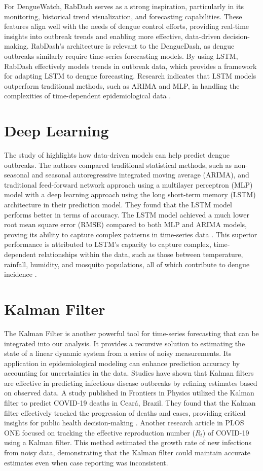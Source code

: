 For DengueWatch, RabDash serves as a strong inspiration, particularly in its monitoring, historical trend visualization, and forecasting capabilities. These features align well with the needs of dengue control efforts, providing real-time insights into outbreak trends and enabling more effective, data-driven decision-making. RabDash’s architecture is relevant to the DengueDash, as dengue outbreaks similarly require time-series forecasting models. By using LSTM, RabDash effectively models trends in outbreak data, which provides a framework for adapting LSTM to dengue forecasting. Research indicates that LSTM models outperform traditional methods, such as ARIMA and MLP, in handling the complexities of time-dependent epidemiological data \cite{ligue2022deep}.


\section{Deep Learning}
The study of \cite{ligue2022deep} highlights how data-driven models can help predict dengue outbreaks. The authors compared traditional statistical methods, such as non-seasonal and seasonal autoregressive integrated moving average (ARIMA), and traditional feed-forward network approach using a multilayer perceptron (MLP) model with a deep learning approach using the long short-term memory (LSTM) architecture in their prediction model. They found that the LSTM model performs better in terms of accuracy. The LSTM model achieved a much lower root mean square error (RMSE) compared to both MLP and ARIMA models, proving its ability to capture complex patterns in time-series data \cite{ligue2022deep}. This superior performance is attributed to LSTM’s capacity to capture complex, time-dependent relationships within the data, such as those between temperature, rainfall, humidity, and mosquito populations, all of which contribute to dengue incidence \cite{ligue2022deep}.

\section{Kalman Filter}
The Kalman Filter is another powerful tool for time-series forecasting that can be integrated into our analysis. It provides a recursive solution to estimating the state of a linear dynamic system from a series of noisy measurements. Its application in epidemiological modeling can enhance prediction accuracy by accounting for uncertainties in the data\cite{li2022applications}. Studies have shown that Kalman filters are effective in predicting infectious disease outbreaks by refining estimates based on observed data. A study published in Frontiers in Physics utilized the Kalman filter to predict COVID-19 deaths in Ceará, Brazil. They found that the Kalman filter effectively tracked the progression of deaths and cases, providing critical insights for public health decision-making \cite{ahmadini2021analysis}. Another research article in PLOS ONE focused on tracking the effective reproduction number ($R_t$) of COVID-19 using a Kalman filter. This method estimated the growth rate of new infections from noisy data, demonstrating that the Kalman filter could maintain accurate estimates even when case reporting was inconsistent\cite{arroyo2021tracking}.

